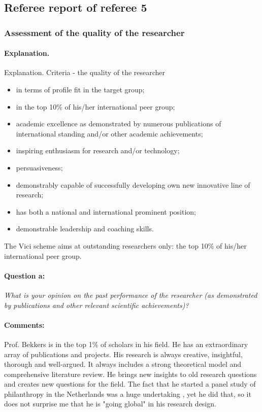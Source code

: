 \documentclass[twocolumn, serif, rga, numeric]{jote-article}
\begin{document}
 {}\subsection*{Referee report of referee 5} 
 {}\subsubsection*{Assessment of the quality of the researcher} 
\paragraph{Explanation.} Explanation. Criteria - the quality of the researcher

\begin{itemize}
    \item in terms of profile fit in the target group;
 \item in the top 10\% of his/her international peer group;
 \item academic excellence as demonstrated by numerous publications of international standing and/or other academic achievements;
 \item inspiring enthusiasm for research and/or technology;
 \item persuasiveness;
 \item demonstrably capable of successfully developing own new innovative line of research;
 \item has both a national and international prominent position;
 \item demonstrable leadership and coaching skills.
    \end{itemize}

 The Vici scheme aims at outstanding researchers only: the top 10\% of his/her international peer group.
\paragraph{Question a:}
\textit{What is your opinion on the past performance of the researcher (as demonstrated by publications and other relevant scientific achievements)?}
\paragraph{Comments:}
Prof. Bekkers is in the top 1\% of scholars in his field. He has an extraordinary array of publications and projects. His research is always creative, insightful, thorough and well-argued. It always includes a strong theoretical model and comprehensive literature review. He brings new insights to old research questions and creates new questions for the field. The fact that he started a panel study of philanthropy in the Netherlands was a huge undertaking , yet he did that, so it does not surprise me that he is "going global" in his research design.
\end{document}
